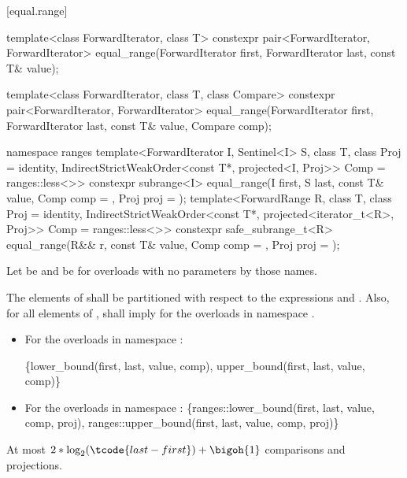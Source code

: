[equal.range]{}

%
\begin{itemdecl}
template<class ForwardIterator, class T>
  constexpr pair<ForwardIterator, ForwardIterator>
    equal_range(ForwardIterator first,
                ForwardIterator last, const T& value);

template<class ForwardIterator, class T, class Compare>
  constexpr pair<ForwardIterator, ForwardIterator>
    equal_range(ForwardIterator first,
                ForwardIterator last, const T& value,
                Compare comp);

namespace ranges {
  template<ForwardIterator I, Sentinel<I> S, class T, class Proj = identity,
           IndirectStrictWeakOrder<const T*, projected<I, Proj>> Comp = ranges::less<>>
    constexpr subrange<I>
      equal_range(I first, S last, const T& value, Comp comp = {}, Proj proj = {});
  template<ForwardRange R, class T, class Proj = identity,
           IndirectStrictWeakOrder<const T*, projected<iterator_t<R>, Proj>> Comp =
             ranges::less<>>
    constexpr safe_subrange_t<R>
      equal_range(R&& r, const T& value, Comp comp = {}, Proj proj = {});
}
\end{itemdecl}

\begin{itemdescr}
\pnum
Let  be  and
 be 
for overloads with no parameters by those names.

\pnum
\requires
The elements  of 
shall be partitioned with respect to the expressions
 and
.
Also, for all elements  of \tcode{[first, last)},
 shall imply 
for the overloads in namespace .

\pnum
\returns
\begin{itemize}
\item
For the overloads in namespace :
\begin{codeblock}
\{lower_bound(first, last, value, comp),
 upper_bound(first, last, value, comp)\}
\end{codeblock}
\item
For the overloads in namespace :
\{ranges::lower_bound(first, last, value, comp, proj),
 ranges::upper_bound(first, last, value, comp, proj)\}
\end{itemize}

\pnum
\complexity
At most
$2 * \log_2(\tcode{last - first}) + \bigoh{1}$ comparisons and projections.
\end{itemdescr}


